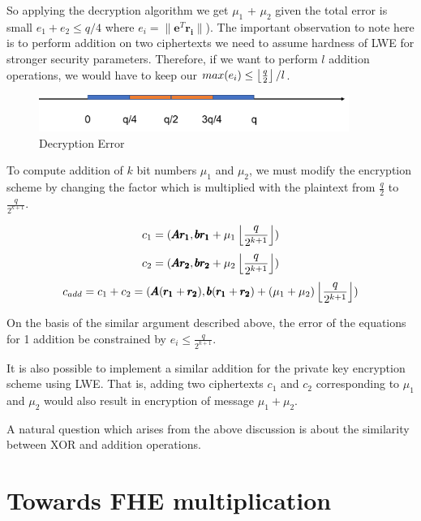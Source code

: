 \documentclass[usletter]{article}
\begin{document}
So applying the decryption algorithm we get $\mu_1$ + $\mu_2$ given the total error
is small $e_1 +e_2 \leq q/4$ where $e_i=\parallel\pmb{e}^{T}\pmb{r_i}\parallel$). The important observation to note here is to perform addition on 
two ciphertexts we need to assume hardness of LWE for stronger security parameters. 
Therefore, if we want to perform $l$ addition operations, we would have to keep our $max(e_i) \leq \left\lfloor \frac{q}{2} \right\rfloor/l$.   

\begin{figure}[!htbp]
\begin{center}
\includegraphics[width=0.9\textwidth]{error.pdf}
\end{center}
\caption{Decryption Error}
\label{error}
\end{figure}

\begin{corollary}
To compute addition of $k$ bit numbers $\mu_1$ and $\mu_2$, we must modify the encryption scheme by changing the factor which is multiplied with the plaintext from $\frac{q}{2}$ to $\frac{q}{2^{k+1}}$.

$$c_1 = ( \pmb{Ar_1}, \pmb{br_1} + \mu_1\left\lfloor \frac{q}{2^{k+1}} \right\rfloor )$$
$$c_2 = ( \pmb{Ar_2}, \pmb{br_2} + \mu_2\left\lfloor \frac{q}{2^{k+1}} \right\rfloor )$$
$$c_{add} = c_1 + c_2 = ( \pmb{A}(\pmb{r_1} + \pmb{r_2}), \pmb{b}(\pmb{r_1} +\pmb{r_2}) + (\mu_1 + \mu_2)\left\lfloor \frac{q}{2^{k+1}} \right\rfloor )$$

On the basis of the similar argument described above, the error of the equations for 1 addition be 
constrained by $e_i \leq \frac{q}{2^{k+1}}$.
\end{corollary}
\begin{remark}
It is also possible to implement a similar addition for the private key encryption  scheme 
using LWE. That is, adding two ciphertexts $c_1$ and $c_2$ corresponding to $\mu_1$ and $\mu_2$
would also result in encryption of message $\mu_1 + \mu_2$.
\end{remark}

\begin{remark}
A natural question which arises from the above discussion is about the similarity between XOR and addition operations.   
\end{remark}

\section{Towards FHE multiplication}
\end{document}

